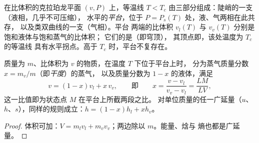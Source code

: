 \begin{proposition}[安德鲁斯等温线]\label{prop:b1:phase-changes:andrews}
在比体积的克拉珀龙平面 $(v, P)$ 上，等温线
$T < T_c$ 由三部分组成：陡峭的一支（液相，几乎不可压缩），
水平的\emph{平台}，位于 $P = P_s(T)$ 处，液、气两相在此共存，
以及类双曲线的一支（气相）。平台
两端的比体积 $v_l(T)$ 与 $v_v(T)$ 分别是饱和液体与饱和蒸气的比体积；
它们的是\emph{}（即穹顶），
其顶点即，该处温度为 $T_c$ 的等温线
具有水平拐点。高于 $T_c$ 时，平台不复存在。
\end{proposition}
\admitted

\begin{theorem}[杠杆规则]\label{thm:b1:phase-changes:lever}
质量为 $m$、比体积为 $v$ 的物质，在温度 $T$ 下位于平台上时，
分为蒸气质量分数 $x = m_v/m$（即\emph{干度}）的蒸气，
以及质量分数为 $1 - x$ 的液体，满足
\[
v = (1 - x)v_l + x\,v_v , \qquad\text{即}\qquad
x = \frac{v - v_l}{v_v - v_l} = \frac{LM}{LV} ,
\]
这一比值即为状态点 $M$ 在平台上所截两段之比。
对单位质量的任一广延量（$u$、
$h$、$s$），同样的规则成立：$h = (1 - x)h_l + xh_v$。
\end{theorem}

\begin{proof}
体积可加：$V = m_lv_l + m_vv_v$；两边除以 $m$。能量、焓与
熵也都是广延量。
\end{proof}

